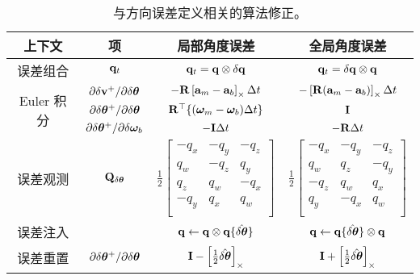 \begin{table*}[tb]
\renewcommand{\arraystretch}{1.7}
\caption{与方向误差定义相关的算法修正。}
\label{tab:local_to_global}
\vspace{1ex}
\centering
\begin{tabular}{|c|c|c|c|}
\hline
上下文 & 项 & 局部角度误差 & 全局角度误差 \\
\hline
\hline
误差组合 & ${\bf q}_t$ & ${\bf q}_t = {\bf q}\otimes\delta{\bf q}$ & ${\bf q}_t = \delta{\bf q}\otimes{\bf q}$ \\
\hline
\hline
\multirow{3}{*}{Euler 积分} & $\partial\delta{\bf v}^+/\partial\delta{\bm \theta}$ & $-{\bf R}\left[{\bf a}_m-{\bf a}_b\right]_\times\Delta t$ & $-\left[{\bf R}({\bf a}_m-{\bf a}_b)\right]_\times\Delta t$ \\
&$\partial\delta{\bm \theta}^+/\partial\delta{\bm \theta}$ & ${\bf R}^{\top}\{({\bm \omega}_m-{\bm \omega}_b)\Delta t\}$ & ${\bf I}$ \\
&$\partial\delta{\bm \theta}^+/\partial\delta{\bm \omega}_b$ & $-{\bf I}\Delta t$ &  $-{\bf R}\Delta t$ \\
\hline
\hline
误差观测 & $
{\bf Q}_{\delta{\bm \theta}}
$ & $\frac12\begin{bmatrix}
-q_x &-q_y &-q_z\\
 q_w &-q_z & q_y\\
 q_z & q_w &-q_x\\
-q_y & q_x & q_w\\
\end{bmatrix}$ & $\frac12\begin{bmatrix}
-q_x &-q_y &-q_z\\
 q_w & q_z &-q_y\\
-q_z & q_w & q_x\\
 q_y &-q_x & q_w\\
\end{bmatrix}$ \\
\hline
误差注入 &  %
& ${\bf q} \gets {\bf q} \otimes {\bf q}\{\hat{\delta{\bm \theta}}\}$ & ${\bf q} \gets {\bf q}\{\hat{\delta{\bm \theta}}\} \otimes {\bf q}$ \\ 
\hline
误差重置 & $\partial\delta{\bm \theta}^+/\partial\delta{\bm \theta}$ & ${\bf I} - \left[\frac12\hat{\delta{\bm \theta}}\right]_\times$ & ${\bf I} + \left[\frac12\hat{\delta{\bm \theta}}\right]_\times$ \\
\hline
\end{tabular}
\end{table*}
